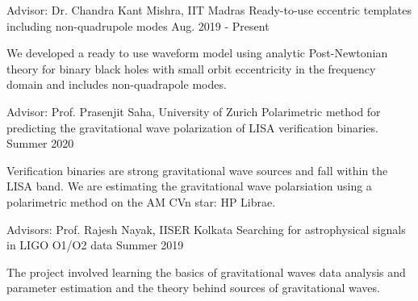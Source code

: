 

\vspace{4 mm}
\begin{cventries}

  \cventry
    {Advisor: Dr. Chandra Kant Mishra, IIT Madras} %
    {Ready-to-use eccentric templates including non-quadrupole modes} %
    {} %
    {Aug. 2019 - Present} %
    {
      \begin{cvitems} %
        \item {We developed a ready to use waveform model using analytic Post-Newtonian theory for binary black holes with small orbit eccentricity in the frequency domain and includes non-quadrapole modes.}
      \end{cvitems}
    }

  \cventry
    {Advisor: Prof. Prasenjit Saha, University of Zurich} %
    {Polarimetric method for predicting the gravitational wave polarization of LISA verification binaries.} %
    {} %
    {Summer 2020} %
    {
      \begin{cvitems} %
        \item {Verification binaries are strong gravitational wave sources and fall within the LISA band. We are estimating the gravitational wave polarsiation using a polarimetric method on the AM CVn star: HP Librae. }
      \end{cvitems}
    }

  \cventry
    {Advisors: Prof. Rajesh Nayak, IISER Kolkata} %
    {Searching for astrophysical signals in LIGO O1/O2 data} %
    {} %
    {Summer 2019} %
    {
      \begin{cvitems} %
        \item {The project involved learning the basics of gravitational waves data analysis and parameter estimation
and the theory behind sources of gravitational waves.}
      \end{cvitems}
    }


\end{cventries}
